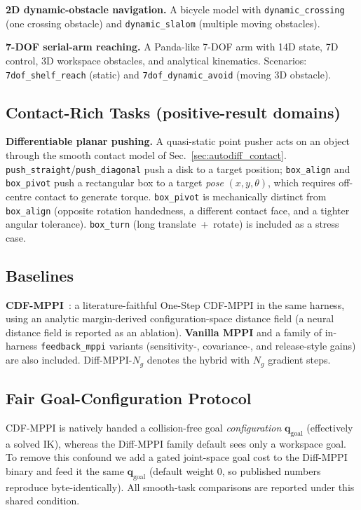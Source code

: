 \documentclass[journal]{IEEEtran}
\begin{document}
\textbf{2D dynamic-obstacle navigation.} A bicycle model with
\texttt{dynamic\_crossing} (one crossing obstacle) and \texttt{dynamic\_slalom}
(multiple moving obstacles).

\textbf{7-DOF serial-arm reaching.} A Panda-like 7-DOF arm with 14D state, 7D
control, 3D workspace obstacles, and analytical kinematics. Scenarios:
\texttt{7dof\_shelf\_reach} (static) and \texttt{7dof\_dynamic\_avoid} (moving
3D obstacle).

\subsection{Contact-Rich Tasks (positive-result domains)}

\textbf{Differentiable planar pushing.} A quasi-static point pusher acts on an
object through the smooth contact model of Sec.~\ref{sec:autodiff_contact}.
\texttt{push\_straight}/\texttt{push\_diagonal} push a disk to a target
position; \texttt{box\_align} and \texttt{box\_pivot} push a rectangular box to
a target \emph{pose} $(x,y,\theta)$, which requires off-centre contact to
generate torque. \texttt{box\_pivot} is mechanically distinct from
\texttt{box\_align} (opposite rotation handedness, a different contact face, and
a tighter angular tolerance). \texttt{box\_turn} (long translate~+~rotate) is
included as a stress case.

\subsection{Baselines}

\textbf{CDF-MPPI}~\cite{cdf_mppi}: a literature-faithful One-Step CDF-MPPI in the
same harness, using an analytic margin-derived configuration-space distance
field (a neural distance field is reported as an ablation). \textbf{Vanilla
MPPI} and a family of in-harness \texttt{feedback\_mppi} variants
(sensitivity-, covariance-, and release-style gains) are also included.
Diff-MPPI-$N_g$ denotes the hybrid with $N_g$ gradient steps.

\subsection{Fair Goal-Configuration Protocol}

CDF-MPPI is natively handed a collision-free goal \emph{configuration}
$\mathbf{q}_{\text{goal}}$ (effectively a solved IK), whereas the Diff-MPPI
family default sees only a workspace goal. To remove this confound we add a
gated joint-space goal cost to the Diff-MPPI binary and feed it the same
$\mathbf{q}_{\text{goal}}$ (default weight $0$, so published numbers reproduce
byte-identically). All smooth-task comparisons are reported under this shared
condition.
\end{document}
